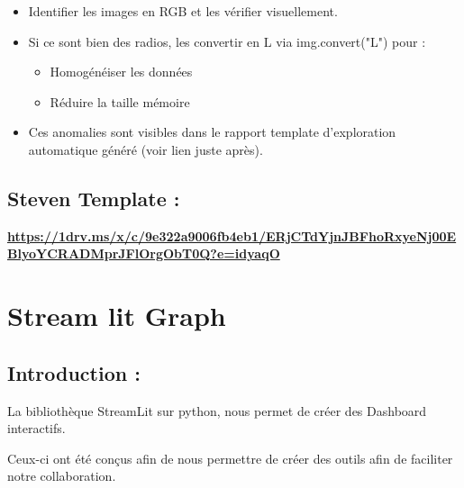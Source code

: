 \begin{itemize}
\item
  Identifier les images en RGB et les vérifier visuellement.
\item
  Si ce sont bien des radios, les convertir en L via img.convert("L")
  pour :

  \begin{itemize}
  \tightlist
  \item
    Homogénéiser les données
  \item
    Réduire la taille mémoire
  \end{itemize}
\item
  Ces anomalies sont visibles dans le rapport template d'exploration
  automatique généré (voir lien juste après).
\end{itemize}

\subsection[Steven Template
:]{\texorpdfstring{\protect\hypertarget{anchor-22}{}{}\protect\hypertarget{anchor-23}{}{}\protect\hypertarget{anchor-24}{}{}Steven
Template :}{Steven Template :}}\label{steven-template}

\href{https://1drv.ms/x/c/9e322a9006fb4eb1/ERjCTdYjnJBFhoRxyeNj00EBlyoYCRADMprJFlOrgObT0Q?e=idyaqO}{\textbf{https://1drv.ms/x/c/9e322a9006fb4eb1/ERjCTdYjnJBFhoRxyeNj00EBlyoYCRADMprJFlOrgObT0Q?e=idyaqO}}

\section[\textbf{Stream lit
Graph}]{\texorpdfstring{\protect\hypertarget{anchor-25}{}{}\protect\hypertarget{anchor-26}{}{}\protect\hypertarget{anchor-27}{}{}\textbf{Stream
lit Graph}}{Stream lit Graph}}\label{stream-lit-graph}

\subsection[Introduction :
]{\texorpdfstring{\protect\hypertarget{anchor-28}{}{}\protect\hypertarget{anchor-29}{}{}Introduction
: }{Introduction : }}\label{introduction-1}

La bibliothèque StreamLit sur python, nous permet de créer des Dashboard
interactifs.

Ceux-ci ont été conçus afin de nous permettre de créer des outils afin
de faciliter notre collaboration.

